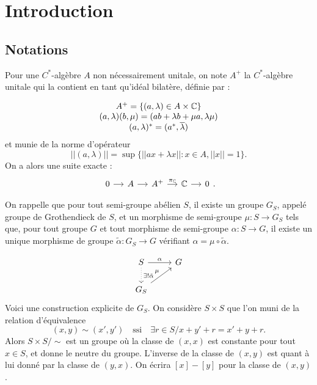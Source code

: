 \section{Introduction}
\subsection{Notations}

Pour une $C^*$-algèbre $A$ non nécessairement unitale, on note $A^+$ la $C^*$-algèbre unitale qui la contient en tant qu'idéal bilatère, définie par :

\[\begin{array}{c}A^+=\{(a,\lambda)\in A\times \mathbb C \} \\ (a,\lambda)(b,\mu)=(ab+\lambda b +\mu a,\lambda\mu) \\ (a,\lambda)^*=(a^*,\overline\lambda)\end{array}\]
et munie de la norme d'opérateur
\[||(a,\lambda)||=\sup \{||ax+\lambda x|| : x\in A , ||x||=1\}.\]
 On a alors une suite exacte :
\[\begin{tikzcd}[column sep = small] 0 \arrow{r} &  A \arrow{r} & A^+ \arrow{r}{\pi_\C} & \C \arrow{r} & 0 \end{tikzcd}.\]

On rappelle que pour tout semi-groupe abélien $S$, il existe un groupe $G_S$, appelé groupe de Grothendieck de $S$, et un morphisme de semi-groupe $\mu : S\rightarrow G_S$ tels que, pour tout groupe $G$ et tout morphisme de semi-groupe $\alpha : S\rightarrow G$, il existe un unique morphisme de groupe $\tilde \alpha : G_S \rightarrow G$ vérifiant $\alpha = \mu \circ \tilde\alpha$. 

\[\begin{tikzcd} S \arrow{r}{\alpha} \arrow[dotted]{d}{\exists !\tilde\alpha}& G \\
	G_S \arrow{ur}{\mu} & \end{tikzcd}\]
 Voici une construction explicite de $G_S$. On considère $S\times S$ que l'on muni de la relation d'équivalence 
\[(x,y)\sim (x',y') \quad \text{ssi} \quad \exists r \in S/ x+y'+r=x'+y+r.\]
Alors $S\times S/ \sim$ est un groupe où la classe de $(x,x)$ est constante pour tout $x\in S$, et donne le neutre du groupe. L'inverse de la classe de $(x,y)$ est quant à lui donné par la classe de $(y,x)$. On écrira $[x]-[y]$ pour la classe de $(x,y)$.\\

